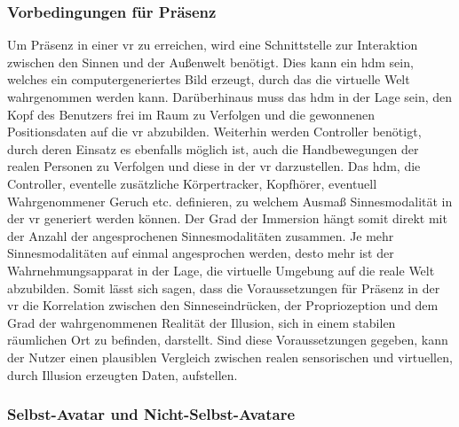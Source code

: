 \documentclass[a4paper,11pt]{article}%
\renewcommand{\\}{\vspace*{0.5\baselineskip} \newline}
\begin{document}
\subsubsection{Vorbedingungen für Präsenz}
Um Präsenz in einer \ac{vr} zu erreichen, wird eine Schnittstelle zur Interaktion zwischen den Sinnen und der Außenwelt benötigt. Dies kann ein \ac{hdm} sein, welches ein computergeneriertes Bild erzeugt, durch das die virtuelle Welt wahrgenommen werden kann. Darüberhinaus muss das \ac{hdm} in der Lage sein, den Kopf des Benutzers frei im Raum zu Verfolgen und die gewonnenen Positionsdaten auf die \ac{vr} abzubilden. Weiterhin werden Controller benötigt, durch deren Einsatz es ebenfalls möglich ist, auch die Handbewegungen der realen Personen zu Verfolgen und diese in der \ac{vr} darzustellen. Das \ac{hdm}, die Controller, eventelle zusätzliche Körpertracker, Kopfhörer, eventuell Wahrgenommener Geruch etc. definieren, zu welchem Ausmaß Sinnesmodalität in der \ac{vr} generiert werden können. Der Grad der Immersion hängt somit direkt mit der Anzahl der angesprochenen Sinnesmodalitäten zusammen. Je mehr Sinnesmodalitäten auf einmal angesprochen werden, desto mehr ist der Wahrnehmungsapparat in der Lage, die virtuelle Umgebung auf die reale Welt abzubilden. \\
Somit lässt sich sagen, dass die Voraussetzungen für Präsenz in der \ac{vr} die Korrelation zwischen den Sinneseindrücken, der Propriozeption und dem Grad der wahrgenommenen Realität der Illusion, sich in einem stabilen räumlichen Ort zu befinden, darstellt. Sind diese Voraussetzungen gegeben, kann der Nutzer einen plausiblen Vergleich zwischen realen sensorischen und virtuellen, durch Illusion erzeugten Daten, aufstellen. \citep{slater2009we}

\subsubsection{Selbst-Avatar und Nicht-Selbst-Avatare}
\end{document}
